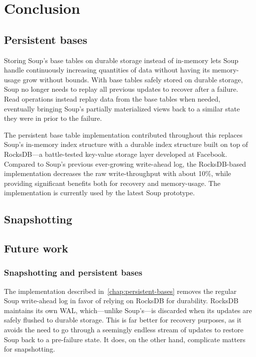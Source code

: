 \chapter{Conclusion}\label{chap:conclusion}

\section{Persistent bases}

Storing Soup's base tables on durable storage instead of in-memory lets Soup
handle continuously increasing quantities of data without having its
memory-usage grow without bounds. With base tables safely stored on durable
storage, Soup no longer needs to replay all previous updates to recover after a
failure. Read operations instead replay data from the base tables when needed,
eventually bringing Soup's partially materialized views back to a similar state
they were in prior to the failure.

The persistent base table implementation contributed throughout this replaces
Soup's in-memory index structure with a durable index structure built on top of
RocksDB---a battle-tested key-value storage layer developed at Facebook.
Compared to Soup's previous ever-growing write-ahead log, the RocksDB-based
implementation decreases the raw write-throughput with about 10\%, while
providing significant benefits both for recovery and memory-usage. The
implementation is currently used by the latest Soup prototype.

\section{Snapshotting}


\section{Future work}\label{sec:future-work}

\subsection{Snapshotting and persistent bases}

The  implementation described
in~\ref{chap:persistent-bases} removes the regular Soup write-ahead log in favor
of relying on RocksDB for durability. RocksDB maintains its own WAL,
which---unlike Soup's---is discarded when its updates are safely flushed to
durable storage. This is far better for recovery purposes, as it avoids the need
to go through a seemingly endless stream of updates to restore Soup back to a
pre-failure state. It does, on the other hand, complicate matters for
snapshotting.

